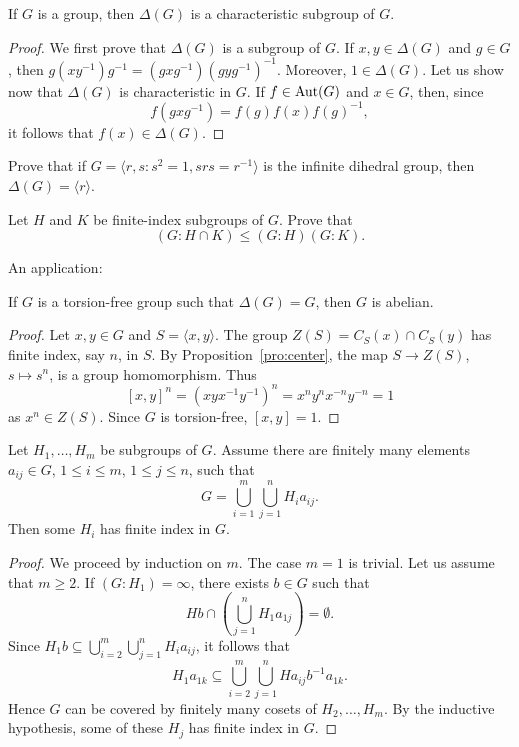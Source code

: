 \begin{lemma}
	If $G$ is a group, then $\Delta(G)$ 
	is a characteristic subgroup of $G$.
\end{lemma}

\begin{proof}
	We first prove that $\Delta(G)$ is a subgroup of $G$. If $x,y\in\Delta(G)$
	and $g\in G$, then $g(xy^{-1})g^{-1}=(gxg^{-1})(gyg^{-1})^{-1}$. Moreover, 
	$1\in\Delta(G)$. Let us show now that $\Delta(G)$ is characteristic in $G$. If 
	$f\in\operatorname{Aut}(G)$ and $x\in G$, then, since 
	\[
	f(gxg^{-1})=f(g)f(x)f(g)^{-1},
	\]
	it follows that $f(x)\in\Delta(G)$.
\end{proof}

\begin{exercise}
	Prove that if $G=\langle r,s:s^2=1,srs=r^{-1}\rangle$ is the
	infinite dihedral group, then $\Delta(G)=\langle r\rangle$.
\end{exercise}

\begin{exercise}
	Let $H$ and $K$ be finite-index subgroups of $G$. Prove that
	\[
	(G:H\cap K)\leq (G:H)(G:K). 
	\]
\end{exercise}

An application: 

\begin{proposition}
	\label{pro:FCabeliano}
	If $G$ is a torsion-free group such 
	that $\Delta(G)=G$, then $G$ is abelian.
\end{proposition}

\begin{proof}
	Let $x,y\in G$ and $S=\langle x,y\rangle$. The group $Z(S)=C_S(x)\cap C_S(y)$ has 
	finite index, say $n$, in $S$. By Proposition~\ref{pro:center}, 
	the map $S\to Z(S)$, $s\mapsto s^n$, is a group homomorphism. Thus  
	\[
		[x,y]^n=(xyx^{-1}y^{-1})^n=x^ny^nx^{-n}y^{-n}=1
	\]
	as $x^n\in Z(S)$. Since $G$ is torsion-free, $[x,y]=1$.
\end{proof}

\begin{lemma}[Neumann]
	\label{lem:Neumann}
	Let $H_1,\dots,H_m$ be subgroups of $G$. 
	Assume there are finitely many elements
	$a_{ij}\in G$, $1\leq i\leq m$, $1\leq j\leq n$, such that 
	\[
		G=\bigcup_{i=1}^m\bigcup_{j=1}^n H_ia_{ij}.
	\]
	Then some $H_i$ has finite index in $G$.
\end{lemma}

\begin{proof}
	We proceed by induction on $m$. The case $m=1$ is trivial. 
	Let us assume that $m\geq2$. If $(G:H_1)=\infty$, there exists $b\in G$
	such that 
	\[
		Hb\cap\left(
	\bigcup_{j=1}^nH_1a_{1j}\right)=\emptyset.
	\]
	Since $H_1b\subseteq\bigcup_{i=2}^m\bigcup_{j=1}^n H_ia_{ij}$, 
	it follows that 
	\[
		H_1a_{1k}\subseteq \bigcup_{i=2}^m\bigcup_{j=1}^n Ha_{ij}b^{-1}a_{1k}.
	\]
	Hence $G$ can be covered by finitely many cosets of $H_2,\dots,H_m$. By the inductive hypothesis, 
	some of these $H_j$ has finite index in $G$.
\end{proof}

